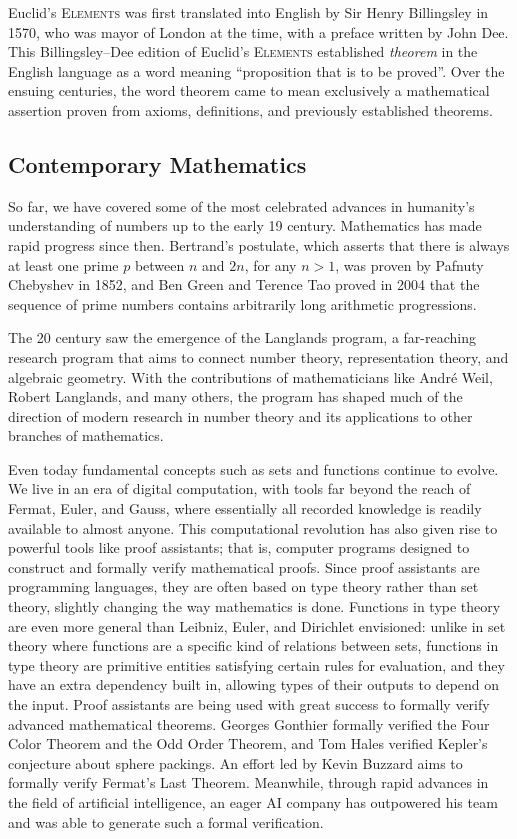 Euclid's \textsc{Elements} was first translated into English by Sir Henry Billingsley in 1570, who was mayor of London at the time, with a preface written by John Dee. This Billingsley--Dee edition of Euclid’s \textsc{Elements} established \emph{theorem} in the English language as a word meaning “proposition that is to be proved”. Over the ensuing centuries, the word theorem came to mean exclusively a mathematical assertion proven from axioms, definitions, and previously established theorems.

\subsection{Contemporary Mathematics}

So far, we have covered some of the most celebrated advances in humanity's understanding of numbers up to the early 19\supth{} century. Mathematics has made rapid progress since then. Bertrand's postulate, which asserts that there is always at least one prime $p$ between $n$ and $2n$, for any $n>1$, was proven by Pafnuty Chebyshev in 1852, and Ben Green and Terence Tao proved in 2004 that the sequence of prime numbers contains arbitrarily long arithmetic progressions.

The 20\supth{} century saw the emergence of the Langlands program, a far-reaching research program that aims to connect number theory, representation theory, and algebraic geometry. With the contributions of mathematicians like André Weil, Robert Langlands, and many others, the program has shaped much of the direction of modern research in number theory and its applications to other branches of mathematics.

Even today fundamental concepts such as sets and functions continue to evolve. We live in an era of digital computation, with tools far beyond the reach of Fermat, Euler, and Gauss, where essentially all recorded knowledge is readily available to almost anyone. This computational revolution has also given rise to powerful tools like proof assistants; that is, computer programs designed to construct and formally verify mathematical proofs. Since proof assistants are programming languages, they are often based on type theory rather than set theory, slightly changing the way mathematics is done. Functions in type theory are even more general than Leibniz, Euler, and Dirichlet envisioned: unlike in set theory where functions are a specific kind of relations between sets, functions in type theory are primitive entities satisfying certain rules for evaluation, and they have an extra dependency built in, allowing types of their outputs to depend on the input. Proof assistants are being used with great success to formally verify advanced mathematical theorems. Georges Gonthier formally verified the Four Color Theorem and the Odd Order Theorem, and Tom Hales verified Kepler's conjecture about sphere packings. An effort led by Kevin Buzzard aims to formally verify Fermat's Last Theorem. Meanwhile, through rapid advances in the field of artificial intelligence, an eager AI company has outpowered his team and was able to generate such a formal verification.

